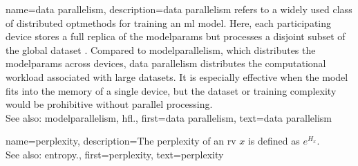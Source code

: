 {name={data parallelism},
	description={\Gls{data} parallelism refers to a widely used 
 		class of distributed \glspl{optmethod} for \gls{training} an \gls{ml} 
             	\gls{model}. Here, each participating \gls{device} stores a full 
             	replica of the \glspl{modelparam} but processes a disjoint subset of 
             	the global \gls{dataset} \cite{DistrOptStatistLearningADMM}. 
             	Compared to \gls{modelparallelism}, which distributes the 
             	\glspl{modelparam} across \glspl{device}, \gls{data} parallelism distributes 
             	the computational workload associated with large \glspl{dataset}. 
             	It is especially effective when the \gls{model} fits into the memory 
             	of a single \gls{device}, but the \gls{dataset} or \gls{training} complexity 
		would be prohibitive without parallel processing. 
             	\\
             	See also: \gls{modelparallelism}, \gls{hfl}.},
 	first={data parallelism},
 	text={data parallelism}
}

{name={perplexity},
	description={The perplexity of an \gls{rv} $x$ is defined as $e^{H_{x}}$.
         	\\
             	See also: \gls{entropy}.},
 	first={perplexity},
 	text={perplexity}
}

